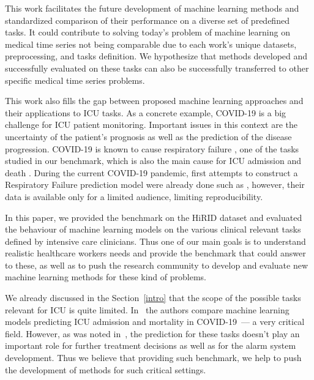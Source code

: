 \documentclass{article}
\begin{document}
This work facilitates the future development of machine learning methods and standardized comparison of their performance on a diverse set of predefined tasks. It could contribute to solving today's problem of machine learning on medical time series not being comparable due to each work's unique datasets, preprocessing, and tasks definition. We hypothesize that methods developed and successfully evaluated on these tasks can also be successfully transferred to other specific medical time series problems.

This work also fills the gap between proposed machine learning approaches and their applications to ICU tasks. As a concrete example, COVID-19 is a big challenge for ICU patient monitoring. Important issues in this context are the uncertainty of the patient's prognosis as well as the prediction of the disease progression. COVID-19 is known to cause respiratory failure \cite{li2020neuroinvasive}, one of the tasks studied in our benchmark, which is also the main cause for ICU admission and death \cite{li2020acute, ruan2020clinical, richardson2020presenting, holter2020systemic}. During the current COVID-19 pandemic, first attempts to construct a Respiratory Failure prediction model were already done such as \cite{bolourani2021machine}, however, their data is available only for a limited audience, limiting
reproducibility.




\iffalse

In this paper, we provided the benchmark on the HiRID dataset and evaluated the behaviour of machine learning models on the various clinical relevant tasks defined by intensive care clinicians. Thus one of our main goals is to understand realistic healthcare workers needs and provide the benchmark that could answer to these, as well as to push the research community to develop and evaluate new machine learning methods for these kind of problems.


We already discussed in the Section~\ref{intro} that the scope of the possible tasks relevant for ICU is quite limited. In~\cite{subudhi2021comparing} the authors compare machine learning models predicting ICU admission and mortality in COVID-19~--- a very critical field. However, as was noted in~\cite{hyland2020early}, the prediction for these tasks doesn't play an important role for further treatment decisions as well as for the alarm system development. Thus we believe that providing such benchmark, we help to push the development of methods for such critical settings.  
\end{document}
